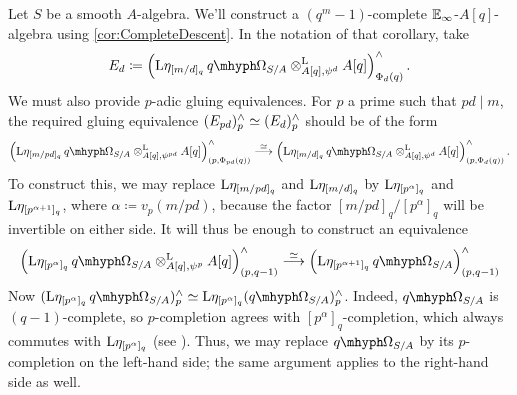 \documentclass[DIV=12,numbers=enddot,leqno,bibliography=totoc]{scrartcl}
\begin{document}
	\begin{numpar}\label{con:TwistedqDeRham}
		Let $S$ be a smooth $A$-algebra. We'll construct a $(q^m-1)$-complete $\mathbb{E}_\infty$-$A[q]$-algebra using \cref{cor:CompleteDescent}. In the notation of that corollary, take
		\begin{equation*}
			E_d\coloneqq \left(\L\eta_{[m/d]_q}\qOmega_{S/A}\lotimes_{A[q],\psi^d}A[q]\right)_{\Phi_d(q)}^\complete\,.
		\end{equation*}
		We must also provide $p$-adic gluing equivalences. For $p$ a prime such that $pd\mid m$, the required gluing equivalence $(E_{pd})_p^\wedge\simeq (E_d)_p^\wedge$ should be of the form
		\begin{equation*}
			\left(\L\eta_{[m/pd]_q}\qOmega_{S/A}\lotimes_{A[q],\psi^{pd}}A[q]\right)_{(p,\Phi_{pd}(q))}^\complete\overset{\simeq}{\longrightarrow}\left(\L\eta_{[m/d]_q}\qOmega_{S/A}\lotimes_{A[q],\psi^d}A[q]\right)_{(p,\Phi_d(q))}^\complete\,.
		\end{equation*}
		To construct this, we may replace $\mathrm{L}\eta_{[m/pd]_q}$ and $\mathrm{L}\eta_{[m/d]_q}$ by $\mathrm{L}\eta_{[p^\alpha]_q}$ and $\mathrm{L}\eta_{[p^{\alpha+1}]_q}$, where $\alpha\coloneqq v_p(m/pd)$, because the factor $[m/pd]_q/[p^\alpha]_q$ will be invertible on either side. It will thus be enough to construct an equivalence
		\begin{equation*}
			\left(\L\eta_{[p^\alpha]_q}\qOmega_{S/A}\lotimes_{A[q],\psi^p}A[q]\right)_{(p,q-1)}^\complete\overset{\simeq}{\longrightarrow} \Bigl(\L\eta_{[p^{\alpha+1}]_q}\qOmega_{S/A}\Bigr)_{(p,q-1)}^\complete
		\end{equation*}
		Now $(\L\eta_{[p^\alpha]_q}\qOmega_{S/A})_p^\complete\simeq \L\eta_{[p^\alpha]_q}(\qOmega_{S/A})_p^\complete$. Indeed, $\qOmega_{S/A}$ is $(q-1)$-complete, so $p$-completion agrees with $[p^\alpha]_q$-completion, which always commutes with $\mathrm{L}\eta_{[p^\alpha]_q}$ (see \cite[Lemma~]{BMS1}). Thus, we may replace $\qOmega_{S/A}$ by its $p$-completion on the left-hand side; the same argument applies to the right-hand side as well.
		

\end{numpar}
\end{document}

